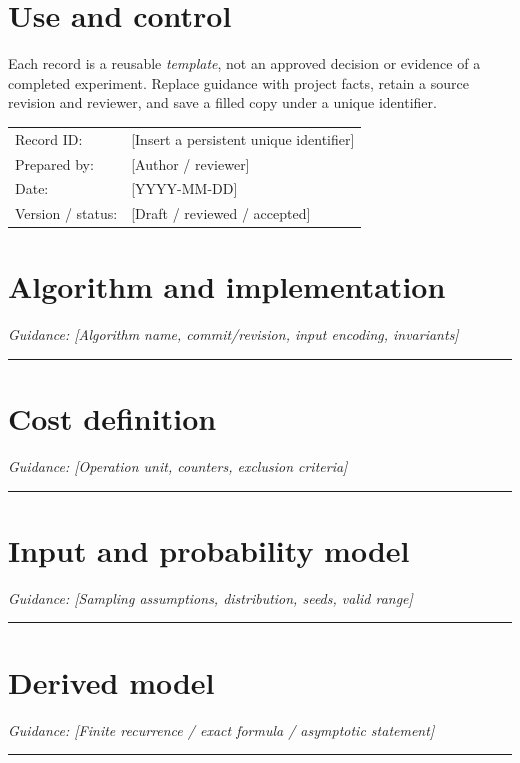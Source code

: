 \documentclass[11pt]{article}
\begin{document}
\makedoctitle
\section{Use and control}
Each record is a reusable \emph{template}, not an approved decision or evidence of a completed experiment. Replace guidance with project facts, retain a source revision and reviewer, and save a filled copy under a unique identifier.\par\medskip
\begin{tabularx}{\linewidth}{@{}lX@{}}Record ID: & [Insert a persistent unique identifier] \\ Prepared by: & [Author / reviewer] \\ Date: & [YYYY-MM-DD] \\ Version / status: & [Draft / reviewed / accepted] \\\end{tabularx}
\section{Algorithm and implementation}
\noindent\textit{Guidance: [Algorithm name, commit/revision, input encoding, invariants]}\par\vspace{0.9cm}\hrule\vspace{0.25cm}
\section{Cost definition}
\noindent\textit{Guidance: [Operation unit, counters, exclusion criteria]}\par\vspace{0.9cm}\hrule\vspace{0.25cm}
\section{Input and probability model}
\noindent\textit{Guidance: [Sampling assumptions, distribution, seeds, valid range]}\par\vspace{0.9cm}\hrule\vspace{0.25cm}
\section{Derived model}
\noindent\textit{Guidance: [Finite recurrence / exact formula / asymptotic statement]}\par\vspace{0.9cm}\hrule\vspace{0.25cm}
\end{document}
